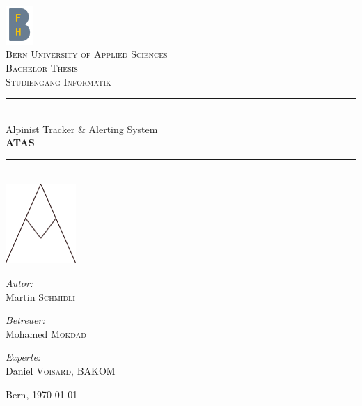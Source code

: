 \documentclass[11pt,english,german]{report}
\theoremstyle{definition}
\begin{document}
\pagestyle{empty} %
\begin{titlepage}
\begin{center}

\includegraphics[width=0.08\textwidth]{img/bfh_logo.png}\\[1cm]    
\textsc{\LARGE Bern University of Applied Sciences}\\[1.5cm]
\textsc{\Large Bachelor Thesis}\\[0.2cm]
\textsc{\Large Studiengang Informatik}\\[0.5cm]

\newcommand{\HRule}{\rule{\linewidth}{0.3mm}}
\HRule \\[0.4cm]
{\huge Alpinist Tracker \& Alerting System}\\[0.3cm]
{\huge \bfseries  ATAS}
\HRule \\[2cm]

\includegraphics[width=0.2\textwidth]{img/atas_logo.png}\\[2.5cm]    

\begin{minipage}{0.3\textwidth}
\begin{flushleft} \large
\emph{Autor:}\\
Martin \textsc{Schmidli}\\
\end{flushleft}
\end{minipage}
\hfill
\begin{minipage}{0.3\textwidth}
\begin{flushleft} \large
\emph{Betreuer:} \\
Mohamed \textsc{Mokdad}
\end{flushleft}
\end{minipage}
\hfill
\begin{minipage}{0.38\textwidth}
\begin{flushleft} \large
\emph{Experte:}\\
Daniel \textsc{Voisard}, BAKOM\\
\end{flushleft}
\end{minipage}

\vspace{20mm}

Bern, {\large \today}
\end{center}
\end{titlepage}
\pagestyle{fancy}
\end{document}
